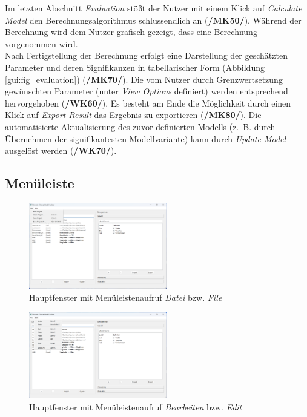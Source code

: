 \documentclass{article}
\begin{document}
Im letzten Abschnitt \emph{Evaluation} stößt der Nutzer mit einem Klick auf \emph{Calculate Model} den Berechnungsalgorithmus schlussendlich an (\textbf{/MK50/}). Während der Berechnung wird dem Nutzer grafisch gezeigt, dass eine Berechnung vorgenommen wird.\\

Nach Fertigstellung der Berechnung erfolgt eine Darstellung der geschätzten Parameter und deren Signifikanzen in tabellarischer Form (Abbildung \ref{gui:fig_evaluation}) (\textbf{/MK70/}). Die vom Nutzer durch Grenzwertsetzung gewünschten Parameter (unter \emph{View Options} definiert) werden entsprechend hervorgehoben (\textbf{/WK60/}). Es besteht am Ende die Möglichkeit durch einen Klick auf \emph{Export Result} das Ergebnis zu exportieren (\textbf{/MK80/}). Die automatisierte Aktualisierung des zuvor definierten Modells (z.~B. durch Übernehmen der signifikantesten Modellvariante) kann durch \emph{Update Model} ausgelöst werden (\textbf{/WK70/}).\\

\newpage

\subsection{Menüleiste}
\begin{figure}[H]%
  \centering
  \includegraphics[width=6cm,trim={0 12cm 18cm 0},clip]{specifications/img/gui-screenshots/menubar1-file.png}
  \caption{Hauptfenster mit Menüleistenaufruf \emph{Datei} bzw. \emph{File}}
  \label{gui:fig_menubar1-file}
\end{figure}

\begin{figure}[H]%
  \centering
  \includegraphics[width=6cm,trim={0 8cm 18cm 0},clip]{specifications/img/gui-screenshots/menubar2-edit.png}
  \caption{Hauptfenster mit Menüleistenaufruf \emph{Bearbeiten} bzw. \emph{Edit}}
  \label{gui:fig_menubar2-edit}
\end{figure}
\end{document}
